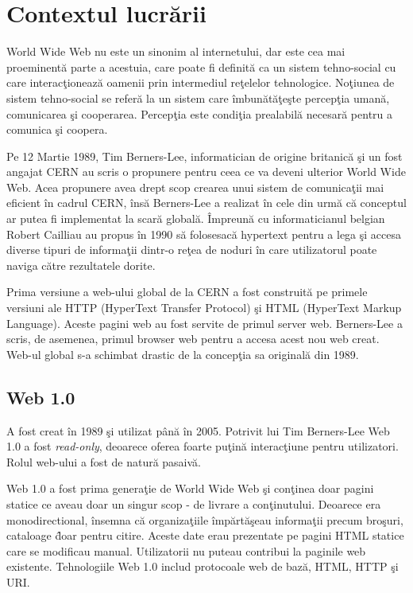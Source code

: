 \documentclass[12pt, a4paper]{report}
\begin{document}
\section{Contextul lucr\u arii}


World Wide Web nu este un sinonim al internetului, dar este cea mai proeminent\u a parte a acestuia, care poate fi definit\u a ca un sistem tehno-social cu care interac\c tioneaz\u a oamenii prin intermediul re\c telelor tehnologice. No\c tiunea de sistem tehno-social se refer\u a la un sistem care \^imbun\u at\u a\c te\c ste percep\c tia uman\u a, comunicarea \c si cooperarea. Percep\c tia este condi\c tia prealabil\u a necesar\u a pentru a comunica \c si coopera.

Pe 12 Martie 1989, Tim Berners-Lee, informatician de origine britanic\u a \c si un fost angajat CERN au scris o propunere pentru ceea ce va deveni ulterior World Wide Web. Acea propunere avea drept scop crearea unui sistem de comunica\c tii mai eficient \^in cadrul CERN, \^ins\u a Berners-Lee a realizat \^in cele din urm\u a c\u a conceptul ar putea fi implementat la scar\u a global\u a. \^Impreun\u a cu informaticianul belgian Robert Cailliau au propus \^in 1990 s\u a folosesac\u a hypertext pentru a lega \c si accesa diverse tipuri de informa\c tii dintr-o re\c tea de noduri \^in care utilizatorul poate naviga c\u atre rezultatele dorite.

Prima versiune a web-ului global de la CERN a fost construit\u a pe primele versiuni ale HTTP (HyperText Transfer Protocol) \c si HTML (HyperText Markup Language). Aceste pagini web au fost servite de primul server web. Berners-Lee a scris, de asemenea, primul browser web pentru a accesa acest nou web creat. Web-ul global s-a schimbat drastic de la concep\c tia sa original\u a din 1989.

\subsection{Web 1.0}

A fost creat \^in 1989 \c si utilizat p\^an\u a \^in 2005. Potrivit lui Tim Berners-Lee Web 1.0 a fost \emph{read-only}, deoarece oferea foarte pu\c tin\u a interac\c tiune pentru utilizatori. Rolul web-ului a fost de natur\u a pasaiv\u a.

Web 1.0 a fost prima genera\c tie de World Wide Web \c si con\c tinea doar pagini statice ce aveau doar un singur scop - de livrare a con\c tinutului. Deoarece era monodirectional, \^ insemna c\u a organiza\c tiile \^ imp\u art\u a\c seau informa\c tii precum bro\c suri, cataloage \^ doar pentru citire. Aceste date erau prezentate pe pagini HTML statice care se modificau manual. Utilizatorii nu puteau contribui la paginile web existente. Tehnologiile Web 1.0 includ protocoale web de baz\u a, HTML, HTTP \c si URI. \cite{web-1}
\end{document}
